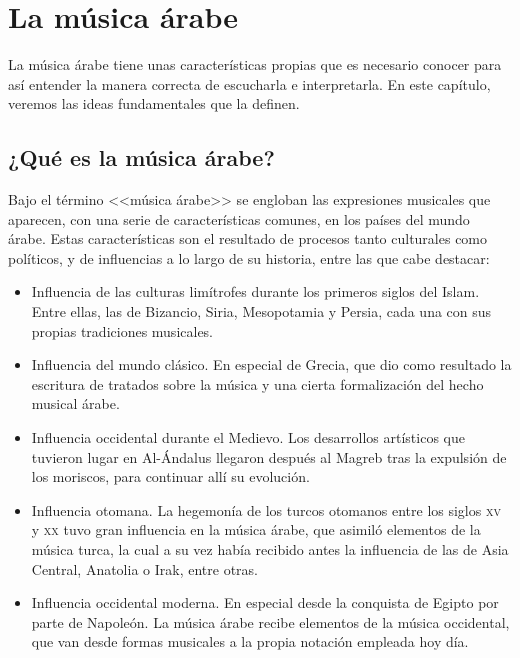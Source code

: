 \chapter{La música árabe}

  \pagestyle{fancyplain}

    La música árabe tiene unas características propias que es necesario conocer para así entender la manera correcta de escucharla e interpretarla. En este capítulo, veremos las ideas fundamentales que la definen.

    \section{¿Qué es la música árabe?}

    Bajo el término <<música árabe>> se engloban las expresiones musicales que aparecen, con una serie de características comunes, en los países del mundo árabe. Estas características son el resultado de procesos tanto culturales como políticos, y de influencias a lo largo de su historia, entre las que cabe destacar:

    \begin{itemize}
    \item Influencia de las culturas limítrofes durante los primeros siglos del Islam. Entre ellas, las de Bizancio, Siria, Mesopotamia y Persia, cada una con sus propias tradiciones musicales.
    \item Influencia del mundo clásico. En especial de Grecia, que dio como resultado la escritura de tratados sobre la música y una cierta formalización del hecho musical árabe.
    \item Influencia occidental durante el Medievo. Los desarrollos artísticos que tuvieron lugar en Al-Ándalus llegaron después al Magreb tras la expulsión de los moriscos, para continuar allí su evolución.
    \item Influencia otomana. La hegemonía de los turcos otomanos entre los siglos \textsc{xv} y \textsc{xx} tuvo gran influencia en la música árabe, que asimiló elementos de la música turca, la cual a su vez había recibido antes la influencia de las de Asia Central, Anatolia o Irak, entre otras.
    \item Influencia occidental moderna. En especial desde la conquista de Egipto por parte de Napoleón. La música árabe recibe elementos de la música occidental, que van desde formas musicales a la propia notación empleada hoy día.
    \end{itemize}


